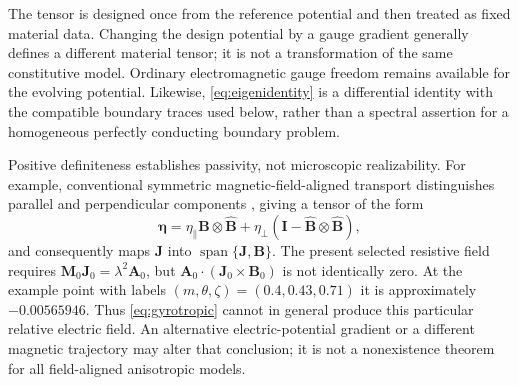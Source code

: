\documentclass[11pt,a4paper]{article}
\theoremstyle{remark}\newtheorem{remark}{Remark}
\numberwithin{equation}{section}
\newcommand{\BB}{\boldsymbol B}
\newcommand{\JJ}{\boldsymbol J}
\newcommand{\Avec}{\boldsymbol A}
\newcommand{\MM}{\boldsymbol M}
\newcommand{\etab}{\boldsymbol\eta}
\newcommand{\Id}{\boldsymbol I}
\begin{document}
The tensor is designed once from the reference potential and then treated as fixed material data. Changing the design potential by a gauge gradient generally defines a different material tensor; it is not a transformation of the same constitutive model. Ordinary electromagnetic gauge freedom remains available for the evolving potential. Likewise, \eqref{eq:eigenidentity} is a differential identity with the compatible boundary traces used below, rather than a spectral assertion for a homogeneous perfectly conducting boundary problem.

Positive definiteness establishes passivity, not microscopic realizability. For example, conventional symmetric magnetic-field-aligned transport distinguishes parallel and perpendicular components \citep{Braginskii1965,Poulipoulis}, giving a tensor of the form
\begin{equation}
\etab=\eta_\parallel\widehat{\BB}\otimes\widehat{\BB}
+\eta_\perp(\Id-\widehat{\BB}\otimes\widehat{\BB}),
\label{eq:gyrotropic}
\end{equation}
and consequently maps $\JJ$ into $\operatorname{span}\{\JJ,\BB\}$. The present selected resistive field requires $\MM_0\JJ_0=\lambda^2\Avec_0$, but $\Avec_0\cdot(\JJ_0\times\BB_0)$ is not identically zero. At the example point with labels $(m,\theta,\zeta)=(0.4,0.43,0.71)$ it is approximately $-0.00565946$. Thus \eqref{eq:gyrotropic} cannot in general produce this particular relative electric field. An alternative electric-potential gradient or a different magnetic trajectory may alter that conclusion; it is not a nonexistence theorem for all field-aligned anisotropic models.
\end{document}
